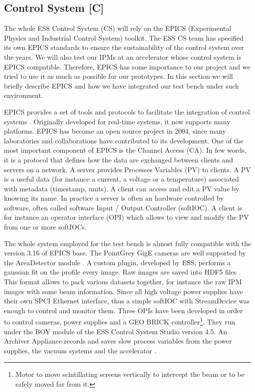 \begin{refsection}
  \subsection{Control System [C]}
  The whole ESS Control System (CS) will rely on the EPICS (Experimental Physics and Industrial Control System) toolkit. The ESS CS team has specified its own EPICS standards to ensure the sustainability of the control system over the years. We will also test our IPMs at an accelerator whose control system is EPICS compatible. Therefore, EPICS has some importance to our project and we tried to use it as much as possible for our prototypes. In this section we will briefly describe EPICS and how we have integrated our test bench under such environment.

  EPICS provides a set of tools and protocols to facilitate the integration of control systems \cite{epics2019}. Originally developed for real-time systems, it now supports many platforms. EPICS has become an open source project in 2004, since many laboratories and collaborations have contributed to its development.
  One of the most important component of EPICS is the Channel Access (CA). In few words, it is a protocol that defines how the data are exchanged between clients and servers on a network. A server provides Processes Variables (PV) to clients. A PV is a useful data (for instance a current, a voltage or a temperature) associated with metadata (timestamp, units). A client can access and edit a PV value by knowing its name. In practice a server is often an hardware controlled by software, often called software Input / Output Controller (softIOC). A client is for instance an operator interface (OPI) which allows to view and modify the PV from one or more softIOCs.

  The whole system employed for the test bench is almost fully compatible with the version 3.16 of EPICS base. The PointGrey GigE cameras are well supported by the AreaDetector module \cite{ad2019}. A custom plugin, developed by ESS, performs a gaussian fit on the profile every image. Raw images are saved into HDF5 files \cite{hdf5}. This format allows to pack  various datasets together, for instance the raw IPM images with some beam information.
  Since all high voltage power supplies have their own SPCI Ethernet interface, thus a simple softIOC with StreamDevice\cite{streamdevice2019} was enough to control and monitor them.
  Three OPIs have been developed in order to control cameras, power supplies and a GEO BRICK controller\footnote{Motor to move scintillating screens vertically to intercept the beam or to be safely moved far from it.}. They run under the BOY module of the ESS Control System Studio version 4.5. An Archiver Appliance records and saves slow process variables from the power supplies, the vacuum systems and the accelerator \cite{archiver2019}.


\end{refsection}
